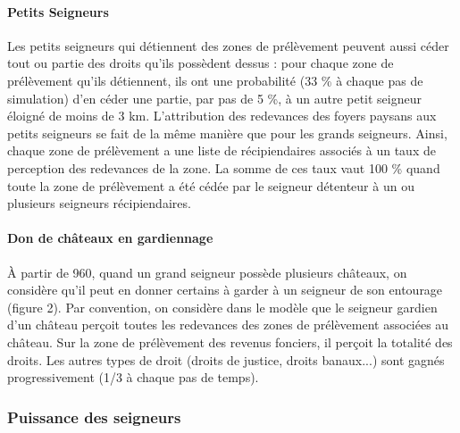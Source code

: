 \documentclass[12pt, a4paper, oneside]{book}
\begin{document}
	\paragraph{Petits Seigneurs}
	Les petits seigneurs qui détiennent des zones de prélèvement peuvent aussi céder tout ou partie des droits qu'ils possèdent dessus :
	pour chaque zone de prélèvement qu'ils détiennent, ils ont une probabilité (33 \% à chaque pas de simulation) d'en céder une partie, par pas de 5 \%, à un autre petit seigneur éloigné de moins de 3 km.
	L'attribution des redevances des foyers paysans aux petits seigneurs se fait de la même manière que pour les grands seigneurs.
	Ainsi, chaque zone de prélèvement a une liste de récipiendaires associés à un taux de perception des redevances de la zone.
	La somme de ces taux vaut 100 \% quand toute la zone de prélèvement a été cédée par le seigneur détenteur à un ou plusieurs seigneurs récipiendaires.
	
	\paragraph{Don de châteaux en gardiennage}
	À partir de 960, quand un grand seigneur possède plusieurs châteaux, on considère qu'il peut en donner certains à garder à un seigneur de son entourage (figure 2).
	Par convention, on considère dans le modèle que le seigneur gardien d'un château perçoit toutes les redevances des zones de prélèvement associées au
	château.
	Sur la zone de prélèvement des revenus fonciers, il perçoit la totalité des droits.
	Les autres types de droit (droits de justice, droits banaux...) sont gagnés progressivement (1/3 à chaque pas de temps).
	
	\subsubsection{Puissance des seigneurs}
	
\end{document}
